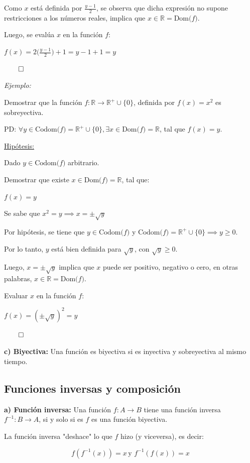 \documentclass{article}
\begin{document}
Como $x$ está definida por $\displaystyle \frac{y - 1}{2}$, se observa que dicha expresión no supone restricciones a los números reales, implica que $x \in \mathbb{R} = \text{Dom($f$)}$.

Luego, se evalúa $x$ en la función $f$:

$\displaystyle f(x) = 2\Big(\frac{y - 1}{2}\Big) + 1 = y - 1 + 1 =  y$

$\qed$

\textit{Ejemplo:}

Demostrar que la función $f: \mathbb{R} \to \mathbb{R}^+ \cup \{0\}$, definida por $f(x) = x^2$ es sobreyectiva.

PD: $\forall y \in \text{Codom($f$)} = \mathbb{R}^+ \cup \{0\}, \exists x \in \text{Dom($f$)} = \mathbb{R}$, tal que $f(x) = y$.

\underline{Hipótesis:}

Dado $y \in \text{Codom($f$)}$ arbitrario.

Demostrar que existe $x \in \text{Dom($f$)} = \mathbb{R}$, tal que:

$f(x) = y$

Se sabe que $x^2 = y \implies x = \pm \sqrt{y}$

Por hipótesis, se tiene que $y \in \text{Codom($f$)}$ y $\text{Codom($f$)} = \mathbb{R}^+ \cup \{0\} \implies y \ge 0$.

Por lo tanto, $y$ está bien definida para $\sqrt{y}$, con $\sqrt{y} \ge 0$.

Luego, $x = \pm \sqrt{y}$ implica que $x$ puede ser positivo, negativo o cero, en otras palabras, $x \in \mathbb{R} = \text{Dom($f$)}$.

Evaluar $x$ en la función $f$:

$f(x) = (\pm \sqrt{y})^2 = y$

$\qed$

\textbf{c) Biyectiva:} Una función es biyectiva si es inyectiva y sobreyectiva al mismo tiempo.

\subsection{Funciones inversas y composición}

\textbf{a) Función inversa:} Una función $f: A \to B$ tiene una función inversa $f^{-1}: B \to A$, si y solo si es $f$ es una función biyectiva.

La función inversa "deshace" lo que $f$ hizo (y viceversa), es decir:

\[f(f^{-1}(x)) = x \, \text{y } f^{-1}(f(x)) = x\]
\end{document}
